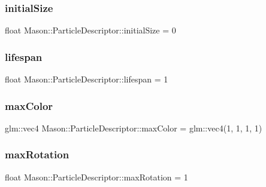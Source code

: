 \subsubsection{\texorpdfstring{initial\+Size}{initialSize}}
{\footnotesize\ttfamily float Mason\+::\+Particle\+Descriptor\+::initial\+Size = 0}

\hypertarget{class_mason_1_1_particle_descriptor_ac38adbef0e6dfa77dd42ade2089595fc}{}\label{class_mason_1_1_particle_descriptor_ac38adbef0e6dfa77dd42ade2089595fc} 
\subsubsection{\texorpdfstring{lifespan}{lifespan}}
{\footnotesize\ttfamily float Mason\+::\+Particle\+Descriptor\+::lifespan = 1}

\hypertarget{class_mason_1_1_particle_descriptor_aa755ad8771cf25c71ec868e16cff41e2}{}\label{class_mason_1_1_particle_descriptor_aa755ad8771cf25c71ec868e16cff41e2} 
\subsubsection{\texorpdfstring{max\+Color}{maxColor}}
{\footnotesize\ttfamily glm\+::vec4 Mason\+::\+Particle\+Descriptor\+::max\+Color = glm\+::vec4(1, 1, 1, 1)}

\hypertarget{class_mason_1_1_particle_descriptor_a9590c7ad32834d9cce9c24d530e75609}{}\label{class_mason_1_1_particle_descriptor_a9590c7ad32834d9cce9c24d530e75609} 
\subsubsection{\texorpdfstring{max\+Rotation}{maxRotation}}
{\footnotesize\ttfamily float Mason\+::\+Particle\+Descriptor\+::max\+Rotation = 1}

\hypertarget{class_mason_1_1_particle_descriptor_a394842f237899eb5fcd3091c8dd2ba89}{}\label{class_mason_1_1_particle_descriptor_a394842f237899eb5fcd3091c8dd2ba89} 
